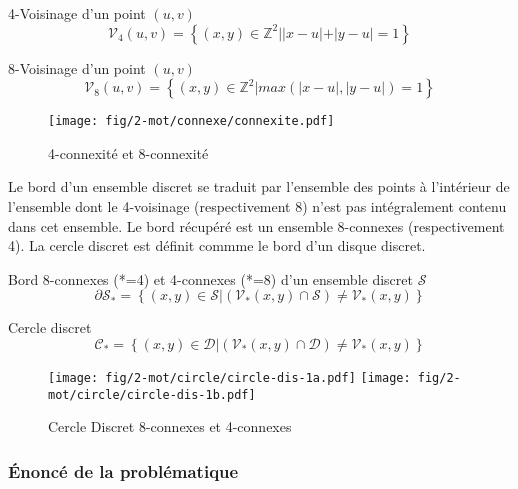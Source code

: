\begin{Definition}{4-Voisinage d'un point $(u,v)$}
\label{def:vois-4}
  $$\mathcal{V}_4(u,v) =  \left\{ (x,y) \in \mathbb{Z}^{2} |  |x-u|+|y-u| = 1 \right\}$$
\end{Definition}

\begin{Definition}{8-Voisinage d'un point $(u,v)$}
\label{def:vois-8}
  $$\mathcal{V}_8(u,v) =  \left\{ (x,y) \in \mathbb{Z}^{2} |  max(|x-u|,|y-u|) = 1 \right\}$$
\end{Definition}

\begin{figure}[H]
  \centering
  \texttt{[image: fig/2-mot/connexe/connexite.pdf]}
  \caption{4-connexité et 8-connexité}
\end{figure}

Le bord d'un ensemble discret se traduit par l'ensemble des points à l'intérieur de l'ensemble dont le 4-voisinage (respectivement 8) n'est pas intégralement contenu dans cet ensemble. Le bord récupéré est un ensemble 8-connexes (respectivement 4). La cercle discret est définit commme le bord d'un disque discret.

\begin{Definition}{Bord 8-connexes (*=4) et 4-connexes (*=8) d'un ensemble discret $\mathcal{S}$}
\label{def:bord-ens}
  $$ \partial \mathcal{S}_{*} =  \left\{ (x,y) \in \mathcal{S} | \left( \mathcal{V}_{*}(x,y) \cap \mathcal{S} \right) \neq \mathcal{V}_{*}(x,y) \right\}$$
\end{Definition}

\begin{Definition}{Cercle discret}
\label{def:cer-dis}
  $$ \mathcal{C}_{*} =  \left\{ (x,y) \in \mathcal{D} | \left( \mathcal{V}_{*}(x,y) \cap \mathcal{D} \right) \neq \mathcal{V}_{*}(x,y) \right\}$$
\end{Definition}

\begin{figure}[H]
  \centering
  \texttt{[image: fig/2-mot/circle/circle-dis-1a.pdf]}
  \texttt{[image: fig/2-mot/circle/circle-dis-1b.pdf]}
  \caption{Cercle Discret 8-connexes et 4-connexes}
\end{figure}


\subsubsection{Énoncé de la problématique}


